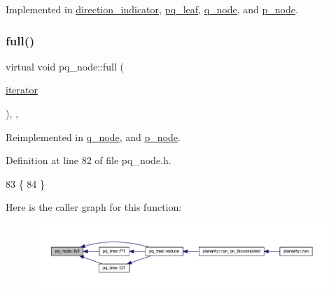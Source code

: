 Implemented in \mbox{\hyperlink{classdirection__indicator_aef2ff42f0a64c7d10fbf42059c008f38}{direction\+\_\+indicator}}, \mbox{\hyperlink{classpq__leaf_a6abf6b0445fe1e5f906e3533d17d5eec}{pq\+\_\+leaf}}, \mbox{\hyperlink{classq__node_affd689cb99e08a874a7ad922aab82cc6}{q\+\_\+node}}, and \mbox{\hyperlink{classp__node_a1853a9f63b6a81e502db0b3ef5a49ada}{p\+\_\+node}}.

\mbox{\label{classpq__node_af1ba861293e4493dba7cc2c9332fee76}} 
\subsubsection{\texorpdfstring{full()}{full()}}
{\footnotesize\ttfamily virtual void pq\+\_\+node\+::full (\begin{DoxyParamCaption}\item[{\mbox{\hyperlink{classpq__node_a34898c9eb1527787c07e8ebefd6bfba5}{iterator}}}]{ }\end{DoxyParamCaption})\hspace{0.3cm}{\ttfamily [inline]}, {\ttfamily [protected]}, {\ttfamily [virtual]}}



Reimplemented in \mbox{\hyperlink{classq__node_a525633c6276761fa795a9b54688cc036}{q\+\_\+node}}, and \mbox{\hyperlink{classp__node_a0ba10aa3a56e26676d78af2e05fb5cd1}{p\+\_\+node}}.



Definition at line 82 of file pq\+\_\+node.\+h.


\begin{DoxyCode}
83     \{
84     \}
\end{DoxyCode}
Here is the caller graph for this function\+:
\nopagebreak
\begin{figure}[H]
\begin{center}
\leavevmode
\includegraphics[width=350pt]{classpq__node_af1ba861293e4493dba7cc2c9332fee76_icgraph}
\end{center}
\end{figure}
\mbox{\label{classpq__node_aa9873c0cfad88bc4404857ce57d422e4}} 

